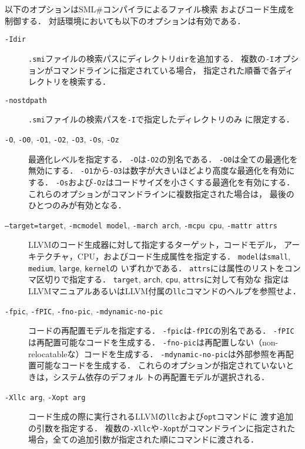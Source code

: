 \documentclass{jbook}
\newcommand{\smlsharp}{SML\#}
\newcommand{\term}[1]{\mbox{{\tt #1}}}
\begin{document}
	以下のオプションは\smlsharp{}コンパイラによるファイル検索
およびコード生成を制御する．
	対話環境においても以下のオプションは有効である．

\begin{description}
\item[{\tt -I\term{dir}}]
	{\tt .smi}ファイルの検索パスにディレクトリ\term{dir}を追加する．
	複数の{\tt -I}オプションがコマンドラインに指定されている場合，
指定された順番で各ディレクトリを検索する．

\item[{\tt -nostdpath}]
	{\tt .smi}ファイルの検索パスを{\tt -I}で指定したディレクトリのみ
に限定する．

\item[{\tt -O},
      {\tt -O0},
      {\tt -O1},
      {\tt -O2},
      {\tt -O3},
      {\tt -Os},
      {\tt -Oz}]
	最適化レベルを指定する．
        {\tt -O}は{\tt -O2}の別名である．
        {\tt -O0}は全ての最適化を無効にする．
	{\tt -O1}から{\tt -O3}は数字が大きいほどより高度な最適化を有効にする．
	{\tt -Os}および{\tt -Oz}はコードサイズを小さくする最適化を有効にする．
	これらのオプションがコマンドラインに複数指定された場合は，
最後のひとつのみが有効となる．

\item[{\tt --target=\term{target}},
      {\tt -mcmodel \term{model}},
      {\tt -march \term{arch}},
      {\tt -mcpu \term{cpu}},
      {\tt -mattr \term{attrs}}]
	LLVMのコード生成器に対して指定するターゲット，コードモデル，
アーキテクチャ，CPU，およびコード生成属性を指定する．
	\term{model}は{\tt small}, {\tt medium}, {\tt large}, {\tt kernel}の
いずれかである．
	\term{attrs}には属性のリストをコンマ区切りで指定する．
	\term{target}, \term{arch}, \term{cpu}, \term{attrs}に対して有効な
指定はLLVMマニュアルあるいはLLVM付属の{\tt llc}コマンドのヘルプを参照せよ．

\item[{\tt -fpic},
      {\tt -fPIC},
      {\tt -fno-pic},
      {\tt -mdynamic-no-pic}]
	コードの再配置モデルを指定する．
	{\tt -fpic}は{\tt -fPIC}の別名である．
	{\tt -fPIC}は再配置可能なコードを生成する．
	{\tt -fno-pic}は再配置しない（non-relocatableな）コードを生成する．
	{\tt -mdynamic-no-pic}は外部参照を再配置可能なコードを生成する．
	これらのオプションが指定されていないときは，システム依存のデフォル
トの再配置モデルが選択される．

\item[{\tt -Xllc \term{arg}},
      {\tt -Xopt \term{arg}}]
	コード生成の際に実行されるLLVMの{\tt llc}および{\tt opt}コマンドに
渡す追加の引数を指定する．
	複数の{\tt -Xllc}や{\tt -Xopt}がコマンドラインに指定された
場合，全ての追加引数が指定された順にコマンドに渡される．
\end{description}
\end{document}
